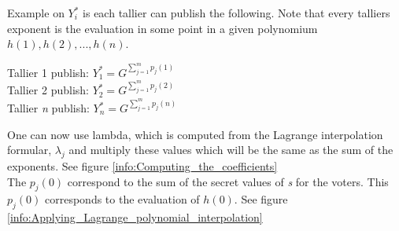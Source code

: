 \noindent
Example on $Y_i^*$ is each tallier can publish the following. Note that every talliers exponent is the evaluation in some point in a given polynomium \begin{math}h(1), h(2),..., h(n) \end{math}.
\begin{center}
Tallier 1 publish: \begin{math}Y_1^* = G^{ \sum\limits_{j=1}^m p_j(1)}   \end{math}\\
Tallier 2 publish: \begin{math}Y_2^* = G^{ \sum\limits_{j=1}^m p_j(2)}   \end{math}\\
Tallier \textit{n} publish: \begin{math}Y_n^* = G^{ \sum\limits_{j=1}^m p_j(n)}  \end{math}\\
\end{center}

 One can now use lambda, which is computed from the  Lagrange interpolation formular, \begin{math} \lambda_j \end{math} and multiply these values which will be the same as the sum of the exponents. See figure \ref{info:Computing_the_coefficients} \\

\noindent
The \begin{math}p_j(0) \end{math} correspond to the sum of the secret values of \textit{s} for the voters. This \begin{math}p_j(0)\end{math} corresponds to the evaluation of \begin{math}h(0)\end{math}. See figure  \ref{info:Applying_Lagrange_polynomial_interpolation}

